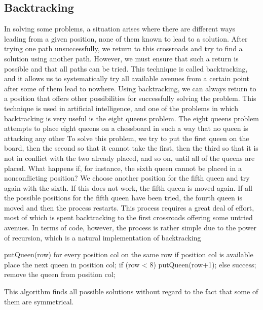 \documentclass{report}
\begin{document}
\subsection{Backtracking}
\bigbreak \noindent 
In solving some problems, a situation arises where there are different ways leading
from a given position, none of them known to lead to a solution. After trying one path
unsuccessfully, we return to this crossroads and try to find a solution using another
path. However, we must ensure that such a return is possible and that all paths can
be tried. This technique is called backtracking, and it allows us to systematically try
all available avenues from a certain point after some of them lead to nowhere. Using
backtracking, we can always return to a position that offers other possibilities for successfully solving the problem. This technique is used in artificial intelligence, and one
of the problems in which backtracking is very useful is the eight queens problem.
\bigbreak \noindent 
The eight queens problem attempts to place eight queens on a chessboard in
such a way that no queen is attacking any other To solve this problem, we try to put the first
queen on the board, then the second so that it cannot take the first, then the third so
that it is not in conflict with the two already placed, and so on, until all of the queens
are placed. What happens if, for instance, the sixth queen cannot be placed in a nonconflicting position? We choose another position for the fifth queen and try again
with the sixth. If this does not work, the fifth queen is moved again. If all the possible
positions for the fifth queen have been tried, the fourth queen is moved and then the process restarts. This process requires a great deal of effort, most of which is spent
backtracking to the first crossroads offering some untried avenues. In terms of code,
however, the process is rather simple due to the power of recursion, which is a natural implementation of backtracking
\bigbreak \noindent 
\begin{cppcode}
    putQueen(row)
        for every position col on the same row
            if position col is available
                place the next queen in position col;
                if (row < 8)
                    putQueen(row+1);
                else success;
                remove the queen from position col;
\end{cppcode}
\bigbreak \noindent 
This algorithm finds all possible solutions without regard to the fact that some of
them are symmetrical.
\end{document}
